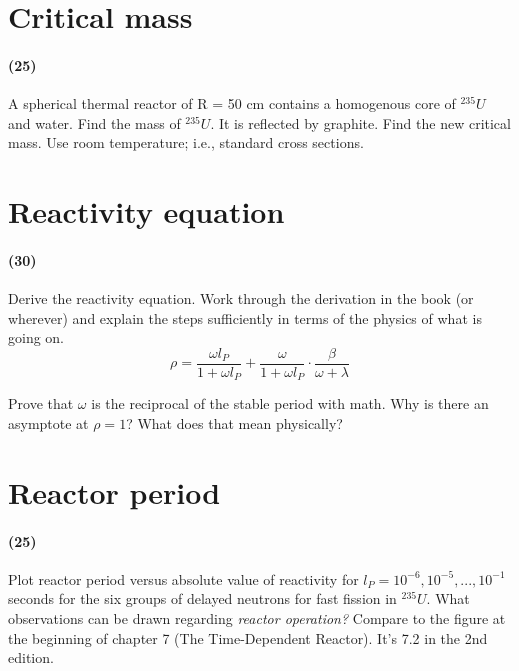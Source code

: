\documentclass[11pt,a4paper]{article}
\begin{document}
\section{Critical mass}
\paragraph*{(25)}
A spherical thermal reactor of R = 50 cm contains a homogenous core of $^{235}U$ and water. Find the mass of $^{235}U$. It is reflected by graphite. Find the new critical mass. Use room temperature; i.e., standard cross sections.





\newpage

\section{Reactivity equation}
\paragraph*{(30)}
Derive the reactivity equation. Work through the derivation in the book (or wherever) and explain the steps sufficiently in terms of the physics of what is going on.
\begin{equation} \label{eq-reactivity}
    \rho=\frac{\omega l_P}{1+\omega l_P}+\frac{\omega}{1+\omega l_P}\cdot\frac{\beta}{\omega+\lambda}
\end{equation}

\vspace{\baselineskip}

\noindent Prove that $\omega$ is the reciprocal of the stable period with math. Why is there an asymptote at $\rho = 1$? What does that mean physically?





\newpage

\section{Reactor period}
\paragraph*{(25)}
Plot reactor period versus absolute value of reactivity for $l_P = 10^{-6},10^{-5},...,10^{-1}$ seconds for the six groups of delayed neutrons for fast fission in $^{235}U$. What observations can be drawn regarding \textit{reactor operation?} Compare to the figure at the beginning of chapter 7 (The Time-Dependent Reactor). It's 7.2 in the 2nd edition.
\end{document}
